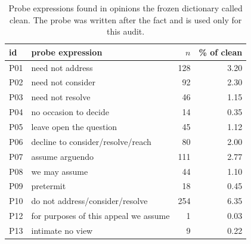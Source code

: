 \begin{table}[t]
\centering\footnotesize
\begin{tabular}{llrr}
\toprule
id & probe expression & $n$ & \% of clean \\
\midrule
P01 & need not address & 128 & 3.20 \\
P02 & need not consider & 92 & 2.30 \\
P03 & need not resolve & 46 & 1.15 \\
P04 & no occasion to decide & 14 & 0.35 \\
P05 & leave open the question & 45 & 1.12 \\
P06 & decline to consider/resolve/reach & 80 & 2.00 \\
P07 & assume arguendo & 111 & 2.77 \\
P08 & we may assume & 44 & 1.10 \\
P09 & pretermit & 18 & 0.45 \\
P10 & do not address/consider/resolve & 254 & 6.35 \\
P12 & for purposes of this appeal we assume & 1 & 0.03 \\
P13 & intimate no view & 9 & 0.22 \\
\bottomrule
\end{tabular}
\caption{Probe expressions found in opinions the frozen dictionary called clean. The probe was written after the fact and is used only for this audit.}
\label{tab:recall}
\end{table}
